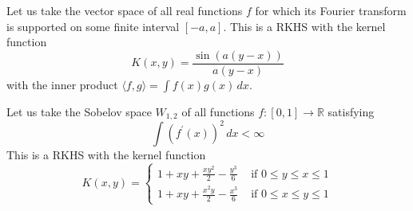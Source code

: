   \begin{example}
    Let us take the vector space of all real functions $f$ for which its Fourier transform is supported on some finite interval $[-a, a]$. This is a RKHS with the kernel function 
    \begin{equation}
      K(x, y) = \frac{\sin(a(y - x))}{a(y - x)}
    \end{equation}
    with the inner product $\langle f, g \rangle = \int f(x) g(x) \,dx$.
  \end{example}

  \begin{example}
    Let us take the Sobelov space $W_{1, 2}$ of all functions $f: [0, 1] \rightarrow \mathbb{R}$ satisfying 
    \begin{equation}
      \int (f^\prime (x))^2 \,dx < \infty
    \end{equation} 
    This is a RKHS with the kernel function 
    \begin{equation}
      K(x, y) = \begin{cases} 1 + xy + \frac{xy^2}{2} - \frac{y^3}{6} & \text{ if } 0 \leq y \leq x \leq 1 \\
        1 + xy + \frac{x^2 y}{2} - \frac{x^3}{6} & \text{ if } 0 \leq x \leq y \leq 1 \end{cases}
    \end{equation}
  \end{example}

